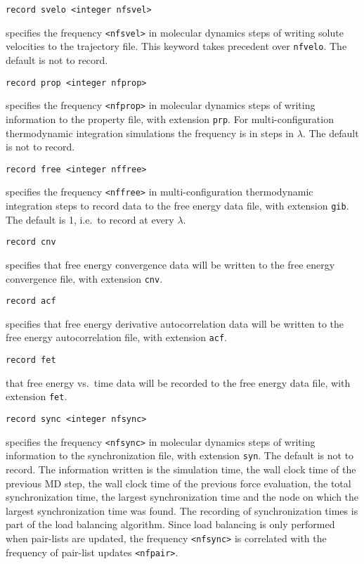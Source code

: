 \begin{description}
\item
\begin{verbatim}
record svelo <integer nfsvel>
\end{verbatim}
specifies the frequency \verb+<nfsvel>+ in molecular dynamics steps
of writing solute velocities to the trajectory file. This keyword
takes precedent over \verb+nfvelo+.
The default is not to record.

\item
\begin{verbatim}
record prop <integer nfprop>
\end{verbatim}
specifies the frequency \verb+<nfprop>+ in molecular dynamics steps
of writing information to the property file, with extension
\verb+prp+. For multi-configuration
thermodynamic integration simulations the frequency is in
steps in $\lambda$. The default is not to record.

\item
\begin{verbatim}
record free <integer nffree>
\end{verbatim}
specifies the frequency \verb+<nffree>+ in multi-configuration
thermodynamic integration steps to record data to the
free energy data file, with extension \verb+gib+.
The default is 1, i.e.\ to record at every $\lambda$.

\item
\begin{verbatim}
record cnv
\end{verbatim}
specifies that free energy convergence data will be written to the
free energy convergence file, with extension \verb+cnv+.

\item
\begin{verbatim}
record acf
\end{verbatim}
specifies that free energy derivative autocorrelation data will be
written to the free energy autocorrelation file, with extension
\verb+acf+.

\item
\begin{verbatim}
record fet
\end{verbatim}
that free energy vs.\ time data will be recorded to the free energy
data file, with extension \verb+fet+.

\item
\begin{verbatim}
record sync <integer nfsync>
\end{verbatim}
specifies the frequency  \verb+<nfsync>+ in molecular dynamics steps
of writing information to the synchronization file, with extension
\verb+syn+. 
The default is not to record.
The information written is the simulation time, the wall clock time
of the previous MD step, the wall clock time of the previous force
evaluation, the total synchronization time, the largest
synchronization time and the node on which the largest synchronization
time was found. The recording of synchronization times is part of the
load balancing algorithm. Since load balancing is only performed when
pair-lists are updated, the frequency \verb+<nfsync>+ is correlated
with the frequency of pair-list updates \verb+<nfpair>+.
\end{description}

